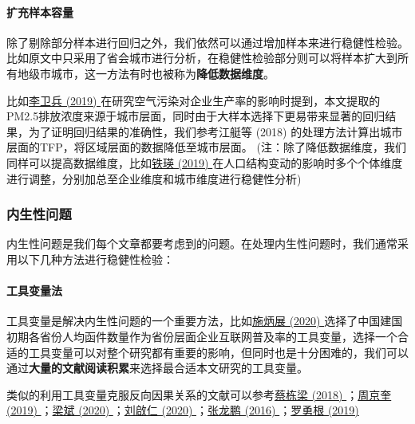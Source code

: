 \documentclass[11pt,a4paper]{ctexart}
\begin{document}
\paragraph{扩充样本容量}

除了剔除部分样本进行回归之外，我们依然可以通过增加样本来进行稳健性检验。比如原文中只采用了省会城市进行分析，在稳健性检验部分则可以将样本扩大到所有地级市城市，这一方法有时也被称为\textbf{降低数据维度}。

比如\href{https://xueshu.baidu.com/usercenter/paper/show?paperid=1a770p60a52b0ec0225k0ew0mx070151&site=xueshu_se}{李卫兵
(2019)
}在研究空气污染对企业生产率的影响时提到，本文提取的PM2.5排放浓度来源于城市层面，同时由于大样本选择下更易带来显著的回归结果，为了证明回归结果的准确性，我们参考江艇等
(2018) 的处理方法计算出城市层面的TFP，将区域层面的数据降低至城市层面。
(注：除了降低数据维度，我们同样可以提高数据维度，比如\href{https://xueshu.baidu.com/usercenter/paper/show?paperid=19340cd0jg3m0c40257b0rv07v282377&site=xueshu_se}{铁瑛
(2019)
}在人口结构变动的影响时多个个体维度进行调整，分别加总至企业维度和城市维度进行稳健性分析)

\subsubsection{内生性问题}

内生性问题是我们每个文章都要考虑到的问题。在处理内生性问题时，我们通常采用以下几种方法进行稳健性检验：

\paragraph{工具变量法}

工具变量是解决内生性问题的一个重要方法，比如\href{https://kns.cnki.net/KCMS/detail/detail.aspx?dbcode=CJFQ&dbname=CJFDLAST2020&filename=GLSJ202004014&v=MzAwNTF0Rnl6bFU3ck1JaUhZWkxHNEhOSE1xNDlFWtextbfSOGVYMUx1eFlTN0RoMVQzcVRyV00xRnJDVVI3cWZZT1I=}{施炳展
(2020)
}选择了中国建国初期各省份人均函件数量作为省份层面企业互联网普及率的工具变量，选择一个合适的工具变量可以对整个研究都有重要的影响，但同时也是十分困难的，我们可以通过\textbf{大量的文献阅读积累}来选择最合适本文研究的工具变量。

类似的利用工具变量克服反向因果关系的文献可以参考\href{https://xueshu.baidu.com/usercenter/paper/show?paperid=141r0rr0x0100640t62m0ch0mr528588&site=xueshu_se}{蔡栋梁
(2018)
}；\href{https://xueshu.baidu.com/usercenter/paper/show?paperid=151n0g00nh720eg0m66y02h06a036701&site=xueshu_se}{周京奎
(2019)
}；\href{https://kns.cnki.net/KCMS/detail/detail.aspx?dbcode=CJFQ&dbname=CJFDLAST2020&filename=JJYJ202003015&uid=WEEvREcwSlJHSldRa1FhcTdnTnhYWUN2MXh5K2o3djRZWGhKYtextbfJWkg1cz0=$9A4hF_YAuvQ5obgVAqNKPCYcEjKensW4IQMovwHtwkF4VYPoHbKxJw!!&v=MzAwOTJUM3FUcldNMUZyQ1VSN3FmWU9SdEZ5M2xXcjNQTHlmU1pMRzRITkhNckk5RVlZUjhlWDFMdXhZUzdEaDE=}{梁斌
(2020)
}；\href{https://xueshu.baidu.com/usercenter/paper/show?paperid=9e6588d93f28008df07c5e43d7e29211&site=xueshu_se&hitarticle=1}{刘啟仁
(2020)
}；\href{https://xueshu.baidu.com/usercenter/paper/show?paperid=5c709096872a578771b4138f3b09df10&site=xueshu_se}{张龙鹏
(2016)
}；\href{https://xueshu.baidu.com/usercenter/paper/show?paperid=1a4p0r10kg000pd0cr0700j049361526&site=xueshu_se}{罗勇根
(2019)}
\end{document}

